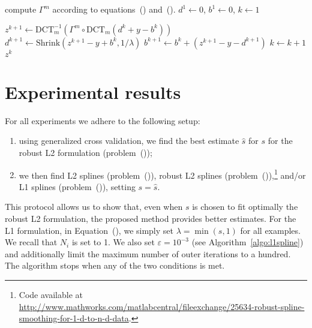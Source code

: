 \documentclass[preprint]{imsart}
\newcommand{\funct}[1]{\mathrm{#1}}
\newcommand{\norm}[2]{\left\| #1 \right\|_{#2}}
\newenvironment{boxedalgorithmic}
  {\begin{lrbox}{\ieeealgbox}
   \begin{minipage}{\dimexpr\textwidth-2\fboxsep-2\fboxrule}
   \begin{algorithmic}}
  {\end{algorithmic}
   \end{minipage}
   \end{lrbox}\noindent\fbox{\usebox{\ieeealgbox}}}
\begin{document}
\begin{figure*}[t]
    \begin{boxedalgorithmic}
        \State compute $\varGamma^m$ according to equations~() and~().
        \State $d^1 \gets 0$, $b^1 \gets 0$, $k \gets 1$
        
        \Repeat
             
                \State $z^{k+1} \gets \funct{DCT}^{-1}_m (\varGamma^m \circ \funct{DCT}_m (d^k + y - b^k))$
                \State $\displaystyle d^{k+1} \gets \funct{Shrink} (z^{k+1} - y + b^k , 1/ \lambda)$
            \EndFor
            \State $b^{k+1} \gets b^k + (z^{k+1} - y - d^{k+1})$
            \State $k \gets k+1$
        \Until{$\norm{z^{k+1} - z^k}{2} \, / \,  \norm{z^k}{2} > \varepsilon$}
        \State \Return $z^k$
        \EndFunction
    \end{boxedalgorithmic}

    \caption{Pseudocode of the L1 spline for evenly spaced-data via Bregman iteration}
    \label{algo:l1spline}
\end{figure*}


\section{Experimental results}
\label{sec:results}

For all experiments we adhere to the following setup:
\begin{enumerate}
    \item using generalized cross validation, we find the best estimate $\hat{s}$ for $s$ for the robust L2 formulation (problem~());
    \item we then find L2 splines (problem~()), robust L2 splines (problem~()),\footnote{Code available at \url{http://www.mathworks.com/matlabcentral/fileexchange/25634-robust-spline-smoothing-for-1-d-to-n-d-data}.} and/or L1 splines (problem~()), setting $s = \hat{s}$.
\end{enumerate}
This protocol allows us to show that, even when $s$ is chosen to fit optimally the robust L2 formulation, the proposed method provides better estimates.
For the L1 formulation, in Equation~(), we simply set $\lambda=\min(s,1)$ for all examples. We recall that $N_i$ is set to 1. We also set $\varepsilon = 10^{-3}$ (see Algorithm~\ref{algo:l1spline}) and additionally limit the maximum number of outer iterations to a hundred. The algorithm stops when any of the two conditions is met.
\end{document}
